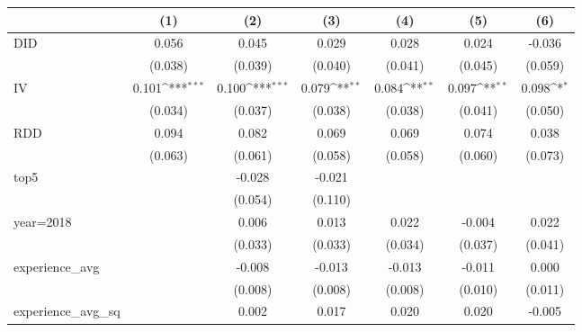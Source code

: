 {
\def\sym#1{\ifmmode^{#1}\else\(^{#1}\)\fi}
\begin{tabular}{l*{6}{c}}
\hline\hline
                &\multicolumn{1}{c}{(1)}         &\multicolumn{1}{c}{(2)}         &\multicolumn{1}{c}{(3)}         &\multicolumn{1}{c}{(4)}         &\multicolumn{1}{c}{(5)}         &\multicolumn{1}{c}{(6)}         \\
\hline
DID             &    0.056         &    0.045         &    0.029         &    0.028         &    0.024         &   -0.036         \\
                &  (0.038)         &  (0.039)         &  (0.040)         &  (0.041)         &  (0.045)         &  (0.059)         \\
IV              &    0.101\sym{***}&    0.100\sym{***}&    0.079\sym{**} &    0.084\sym{**} &    0.097\sym{**} &    0.098\sym{*}  \\
                &  (0.034)         &  (0.037)         &  (0.038)         &  (0.038)         &  (0.041)         &  (0.050)         \\
RDD             &    0.094         &    0.082         &    0.069         &    0.069         &    0.074         &    0.038         \\
                &  (0.063)         &  (0.061)         &  (0.058)         &  (0.058)         &  (0.060)         &  (0.073)         \\
top5            &                  &   -0.028         &   -0.021         &                  &                  &                  \\
                &                  &  (0.054)         &  (0.110)         &                  &                  &                  \\
year=2018       &                  &    0.006         &    0.013         &    0.022         &   -0.004         &    0.022         \\
                &                  &  (0.033)         &  (0.033)         &  (0.034)         &  (0.037)         &  (0.041)         \\
experience\_avg  &                  &   -0.008         &   -0.013         &   -0.013         &   -0.011         &    0.000         \\
                &                  &  (0.008)         &  (0.008)         &  (0.008)         &  (0.010)         &  (0.011)         \\
experience\_avg\_sq&                  &    0.002         &    0.017         &    0.020         &    0.020         &   -0.005         \\

\end{tabular}}
